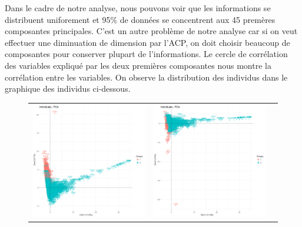 \documentclass[a4paper,11pt,oneside,roman]{article}
\begin{document}
Dans le cadre de notre analyse, nous pouvons voir que les informations se distribuent uniforement et 95\% de données se concentrent aux 45 premères composantes principales. C'est un autre problème de notre analyse car si on veut effectuer une diminuation de dimension par l'ACP, on doit choisir beaucoup de composantes pour conserver plupart de l'informations. Le cercle de corrélation des variables expliqué par les deux premières composantes nous montre la corrélation entre les variables. On observe la distribution des individus dans le graphique des individus ci-dessous. 
\begin{figure}[htb]
    \centering
    \begin{tabular}{ccc}
    \includegraphics[scale = .3]{./discrimination/spambase/indi_plot12.png} &
    \includegraphics[scale = .3]{./discrimination/spambase/indi_plot13.png} 

\end{tabular}
\end{figure}
\end{document}
